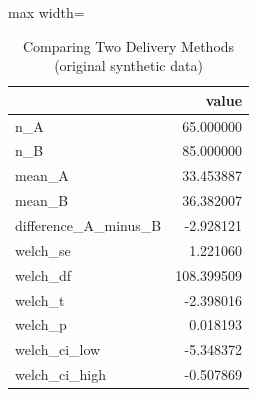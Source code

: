 \begin{table}[htbp]
\centering
\caption{Comparing Two Delivery Methods (original synthetic data)}
\begingroup
\small
\setlength{\tabcolsep}{6pt}
\renewcommand{\arraystretch}{1.12}
\begin{adjustbox}{max width=\linewidth}
\begin{tabular}{@{}lr@{}}
\toprule
 & value \\
\midrule
n\_A & 65.000000 \\
n\_B & 85.000000 \\
mean\_A & 33.453887 \\
mean\_B & 36.382007 \\
difference\_A\_minus\_B & -2.928121 \\
welch\_se & 1.221060 \\
welch\_df & 108.399509 \\
welch\_t & -2.398016 \\
welch\_p & 0.018193 \\
welch\_ci\_low & -5.348372 \\
welch\_ci\_high & -0.507869 \\
\bottomrule
\end{tabular}
\end{adjustbox}
\endgroup
\end{table}